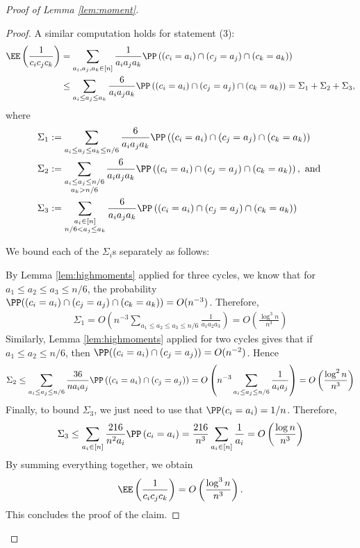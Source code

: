 \documentclass{article}
\begin{document}
\begin{proof}[Proof of Lemma \ref{lem:moment}]
\begin{proof}
A similar computation holds for statement (3):
\begin{align*}
    \EE\left(\frac{1}{c_ic_jc_k}\right)&=\sum_{a_i,a_j,a_k \in [n]}\frac{1}{a_ia_ja_k}\PP\left((c_i=a_i)\cap(c_j=a_j)\cap(c_k=a_k)\right)\\
    &\leq \sum_{a_i\leq a_j\leq a_k}\frac{6}{a_ia_ja_k}\PP\left((c_i=a_i)\cap(c_j=a_j)\cap(c_k=a_k)\right)
    =\Sigma_1+\Sigma_2+\Sigma_3,
\end{align*}
where
\begin{align*}
    &\Sigma_1:=\sum_{a_i\leq a_j\leq a_k\leq n/6}\frac{6}{a_ia_ja_k}\PP\left((c_i=a_i)\cap(c_j=a_j)\cap(c_k=a_k)\right)\\
    &\Sigma_2:= \sum_{\substack{a_i\leq a_j\leq n/6\\ a_k>n/6}}\frac{6}{a_ia_ja_k}\PP\left((c_i=a_i)\cap(c_j=a_j)\cap(c_k=a_k)\right), \textrm{ and }\\
    &\Sigma_3:=\sum_{\substack{a_i\in [n]\\ n/6<a_j\leq a_k}}\frac{6}{a_ia_ja_k}\PP\left((c_i=a_i)\cap(c_j=a_j)\cap(c_k=a_k)\right)
\end{align*}


We bound each of the $\Sigma_i$s separately as follows: 

By Lemma \ref{lem:highmoments} applied for three cycles, we know that for $a_1\leq a_2\leq a_3\leq n/6$, the probability $\PP((c_i=a_i)\cap (c_j=a_j)\cap (c_k=a_k))= O(n^{-3})$. Therefore,
\begin{align*}
    \Sigma_1=O\left(n^{-3}\sum_{a_1\leq a_2\leq a_3\leq n/6}\frac{1}{a_1a_2a_3}\right)=O\left(\frac{\log^3 n}{n^3}\right)
\end{align*}
Similarly, Lemma \ref{lem:highmoments} applied for two cycles gives that if $a_1\leq a_2\leq n/6$, then $\PP((c_i=a_i)\cap(c_j=a_j))=O(n^{-2})$. Hence
\begin{align*}
    \Sigma_2\leq \sum_{a_i\leq a_j\leq n/6}\frac{36}{na_ia_j}\PP\left((c_i=a_i)\cap(c_j=a_j)\right)= O\left(n^{-3}\sum_{a_i\leq a_j\leq n/6}\frac{1}{a_ia_j}\right)=O\left(\frac{\log^2 n}{n^3}\right)
\end{align*}
Finally, to bound $\Sigma_3$, we just need to use that $\PP(c_i=a_i)=1/n$. Therefore,
\begin{align*}
\Sigma_3 \leq \sum_{a_i\in [n]}\frac{216}{n^2a_i}\PP\left(c_i=a_i\right)=\frac{216}{n^3}\sum_{a_i\in [n]}\frac{1}{a_i}=O\left(\frac{\log n}{n^3}\right)
\end{align*}
By summing everything together, we obtain 
\begin{align*}
    \EE\left(\frac{1}{c_ic_jc_k}\right)=O\left(\frac{\log^3 n}{n^3}\right).
\end{align*}
This concludes the proof of the claim.
\end{proof}


\end{proof}
\end{document}
